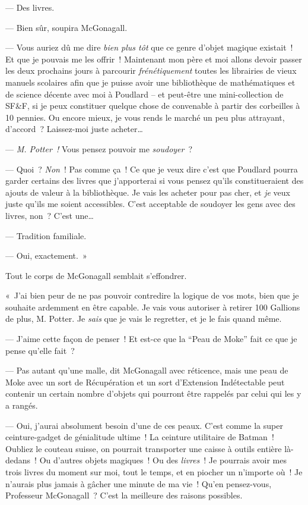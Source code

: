 --- Des livres.

--- Bien sûr, soupira McGonagall.

--- Vous auriez dû me dire \emph{bien plus tôt} que ce genre d'objet magique existait~! Et que je pouvais me les offrir~! Maintenant mon père et moi allons devoir passer les deux prochains jours à parcourir \emph{frénétiquement} toutes les librairies de vieux manuels scolaires afin que je puisse avoir une bibliothèque de mathématiques et de science décente avec moi à Poudlard -- et peut-être une mini-collection de SF\&F, si je peux constituer quelque chose de convenable à partir des corbeilles à 10 pennies. Ou encore mieux, je vous rends le marché un peu plus attrayant, d'accord~? Laissez-moi juste acheter…

--- \emph{M. Potter~!} Vous pensez pouvoir me \emph{soudoyer}~?

--- Quoi~? \emph{Non}~! Pas comme ça~! Ce que je veux dire c'est que Poudlard pourra garder certains des livres que j'apporterai si vous pensez qu'ils constitueraient des ajouts de valeur à la bibliothèque. Je vais les acheter pour pas cher, et \emph{je} veux juste qu'ils me soient accessibles. C'est acceptable de soudoyer les gens avec des livres, non~? C'est une…

--- Tradition familiale.

--- Oui, exactement.~»

Tout le corps de McGonagall semblait s'effondrer.

«~J'ai bien peur de ne pas pouvoir contredire la logique de vos mots, bien que je souhaite ardemment en être capable. Je vais vous autoriser à retirer 100 Gallions de plus, M. Potter. Je \emph{sais} que je vais le regretter, et je le fais quand même.

--- J'aime cette façon de penser~! Et est-ce que la “Peau de Moke” fait ce que je pense qu'elle fait~?

--- Pas autant qu'une malle, dit McGonagall avec réticence, mais une peau de Moke avec un sort de Récupération et un sort d'Extension Indétectable peut contenir un certain nombre d'objets qui pourront être rappelés par celui qui les y a rangés.

--- Oui, j'aurai absolument besoin d'une de ces peaux. C'est comme la super ceinture-gadget de génialitude ultime~! La ceinture utilitaire de Batman~! Oubliez le couteau suisse, on pourrait transporter une caisse à outils entière là-dedans~! Ou d'autres objets magiques~! Ou des \emph{livres}~! Je pourrais avoir mes trois livres du moment sur moi, tout le temps, et en piocher un n'importe où~! Je n'aurais plus jamais à gâcher une minute de ma vie~! Qu'en pensez-vous, Professeur McGonagall~? C'est la meilleure des raisons possibles.

